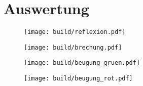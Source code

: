 \section{Auswertung}
\label{sec:auswertung}

\begin{figure}[H]
	\texttt{[image: build/reflexion.pdf]}
	\caption{}
	\label{fig:reflexion}
\end{figure}

\begin{figure}[H]
	\texttt{[image: build/brechung.pdf]}
	\caption{}
	\label{fig:brechung}
\end{figure}

\begin{figure}[H]
	\texttt{[image: build/beugung\_gruen.pdf]}
	\caption{}
	\label{fig:beugung_gruen}
\end{figure}

\begin{figure}[H]
	\texttt{[image: build/beugung\_rot.pdf]}
	\caption{}
	\label{fig:beugung_rot}
\end{figure}

